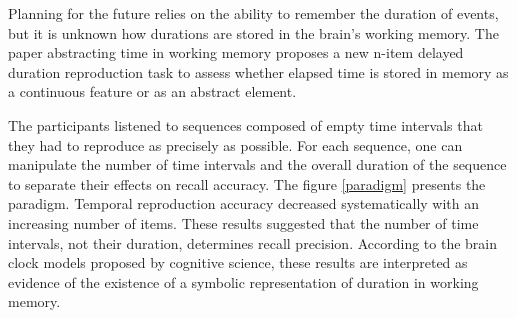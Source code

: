 Planning for the future relies on the ability to remember the duration of events, but it is unknown how durations are stored in the brain's working memory.  The paper abstracting time in working memory proposes a new n-item delayed duration reproduction task to assess whether elapsed time is stored in memory as a continuous feature or as an abstract element. 


The participants listened to sequences composed of empty time intervals that they had to reproduce as precisely as possible. For each sequence, one can manipulate the number of time intervals and the overall duration of the sequence to separate their effects on recall accuracy. The figure \ref{paradigm} presents the paradigm. Temporal reproduction accuracy decreased systematically with an increasing number of items. These results suggested that the number of time intervals, not their duration, determines recall precision. According to the brain clock models proposed by cognitive science, these results are interpreted as evidence of the existence of a symbolic representation of duration in working memory.



